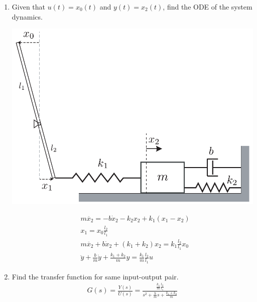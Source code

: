 \documentclass[twoside]{article}
\begin{document}
\begin{enumerate}

\item Given that $u(t) = x_0(t)$ and $y(t) = x_2(t)$,
find the ODE of the system dynamics.
 
\vspace{6pt}

  \begin{minipage}[h]{0.6\linewidth}
    \begin{center}
      \includegraphics[width=1\textwidth]{ex1}
    \end{center}
  \end{minipage}
  \begin{minipage}[h]{0.4\linewidth}
    \begin{center}
 	\begin{align*}
	&m \ddot{x_2} = - b \dot{x}_2 - k_2 x_2 + k_1 (x_1 - x_2)
	\\
	&x_1  = x_0 \frac{l_2}{l_1} 
	\\
	&m \ddot{x_2} + b \dot{x}_2 + (k_1 + k_2) x_2  =  k_1 \frac{l_2}{l_1} x_0
	\\
	&\ddot{y} + \frac{b}{m} \dot{y} + \frac{k_1 + k_2}{m} y  = 
	\frac{k_1}{m} \frac{l_2}{l_1} u
		\end{align*}
    \end{center}
  \end{minipage}
  
  \vspace{6pt}
  
  \item Find the transfer function for same input-output pair.
{\large  
\begin{align*}
G(s) = \frac{Y(s)}{U(s)} = \frac{\frac{k_1}{m} \frac{l_2}{l_1}}{s^2 + \frac{b}{m} s + \frac{k_1 + k_2}{m}}  
\end{align*}
}


\end{enumerate}
\end{document}
